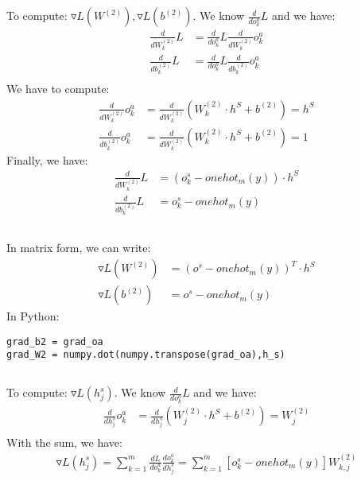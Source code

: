 \documentclass[12pt]{article}
\begin{document}
\subsection{}
To compute: $\triangledown L(W^{(2)}), \triangledown L(b^{(2)})$.
We know $\frac{d}{do^a_k} L$ and we have:
\begin{align*}
\frac{d}{dW^{(2)}_{k}} L &= \frac{d}{do^a_k} L \frac{d}{dW^{(2)}_{k}} o^a_k \\
\frac{d}{db^{(2)}_{k}} L &= \frac{d}{do^a_k} L \frac{d}{db^{(2)}_{k}} o^a_k \\
\end{align*}
We have to compute:
\begin{align*}
\frac{d}{dW^{(2)}_{k}} o^a_k & = \frac{d}{dW^{(2)}_{k}} (W^{(2)}_{k} \cdot h^S + b^{(2)}) = h^S \\
\frac{d}{db^{(2)}_{k}} o^a_k &= \frac{d}{dW^{(2)}_{k}} (W^{(2)}_{k} \cdot h^S + b^{(2)}) = 1
\end{align*}
Finally, we have:
\begin{align*}
\frac{d}{dW^{(2)}_{k}} L & = (o^s_k-onehot_m(y)) \cdot h^S \\
\frac{d}{db^{(2)}_{k}} L & = o^s_k-onehot_m(y)
\end{align*}
\subsection{}
In matrix form, we can write:
\begin{align*}
\triangledown L(W^{(2)}) & = (o^s-onehot_m(y))^T \cdot h^S \\
\triangledown L(b^{(2)}) & = o^s-onehot_m(y)
\end{align*}
In Python:
\begin{lstlisting}
grad_b2 = grad_oa
grad_W2 = numpy.dot(numpy.transpose(grad_oa),h_s)
\end{lstlisting}
\subsection{}
To compute: $\triangledown L(h^s_j)$.
We know $\frac{d}{do^a_k} L$ and we have:
\begin{align*}
\frac{d}{dh^s_j} {o^a_k} &= \frac{d}{dh^s_j} (W^{(2)}_{j} \cdot h^S + b^{(2)}) = W^{(2)}_{j} \\
\end{align*}
With the sum, we have:
\begin{align*}
\triangledown L(h^s_j) = \sum\limits_{k=1}^m \frac{dL}{do^a_k} \frac{d{o^a_k}}{dh^s_j} = 
\sum\limits_{k=1}^m [o^s_k - onehot_m(y)]  W^{(2)}_{k,j}
\end{align*}
\end{document}
